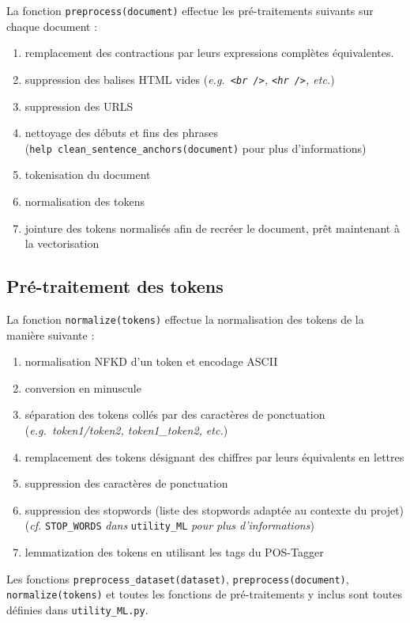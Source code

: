 \documentclass[11pt]{article}
\begin{document}
La fonction \texttt{preprocess(document)} effectue les pré-traitements
suivants sur chaque document :
\begin{enumerate}
  \item remplacement des contractions par
  leurs expressions complètes équivalentes.
  \item suppression des balises
  HTML vides (\emph{e.g.~\texttt{\textless{}br\ /\textgreater{}},
  \texttt{\textless{}hr\ /\textgreater{}}, etc.})
  \item suppression des URLS
  \item nettoyage des débuts et fins des phrases
  (\texttt{help\ clean\_sentence\_anchors(document)} pour plus
  d'informations)
  \item tokenisation du document
  \item normalisation des tokens
  \item jointure des tokens normalisés afin de recréer le document, prêt
  maintenant à la vectorisation
\end{enumerate}

\hypertarget{pruxe9-traitement-des-tokens}{%
\subsection{Pré-traitement des
tokens}\label{pruxe9-traitement-des-tokens}}

La fonction \texttt{normalize(tokens)} effectue la normalisation des
tokens de la manière suivante :
\begin{enumerate}
  \item normalisation NFKD d'un token et
  encodage ASCII
  \item conversion en minuscule
  \item séparation des tokens
  collés par des caractères de ponctuation (\emph{e.g.~token1/token2,
  token1\_token2, etc.})
  \item remplacement des tokens désignant des chiffres
  par leurs équivalents en lettres
  \item suppression des caractères de
  ponctuation
  \item suppression des stopwords (liste des stopwords adaptée au
  contexte du projet) (\emph{cf.} \texttt{STOP\_WORDS} \emph{dans}
  \texttt{utility\_ML} \emph{pour plus d'informations})
  \item lemmatization
  des tokens en utilisant les tags du POS-Tagger
\end{enumerate}

Les fonctions \texttt{preprocess\_dataset(dataset)},
\texttt{preprocess(document)}, \texttt{normalize(tokens)} et toutes les
fonctions de pré-traitements y inclus sont toutes définies dans
\texttt{utility\_ML.py}.
\end{document}
